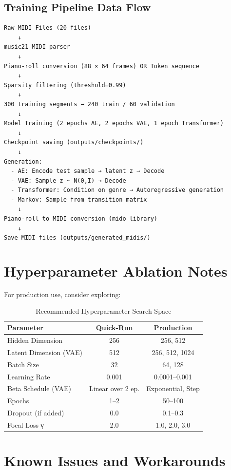 \subsection{Training Pipeline Data Flow}
\begin{verbatim}
Raw MIDI Files (20 files)
    ↓
music21 MIDI parser
    ↓
Piano-roll conversion (88 × 64 frames) OR Token sequence
    ↓
Sparsity filtering (threshold=0.99)
    ↓
300 training segments → 240 train / 60 validation
    ↓
Model Training (2 epochs AE, 2 epochs VAE, 1 epoch Transformer)
    ↓
Checkpoint saving (outputs/checkpoints/)
    ↓
Generation:
  - AE: Encode test sample → latent z → Decode
  - VAE: Sample z ~ N(0,I) → Decode
  - Transformer: Condition on genre → Autoregressive generation
  - Markov: Sample from transition matrix
    ↓
Piano-roll to MIDI conversion (mido library)
    ↓
Save MIDI files (outputs/generated_midis/)
\end{verbatim}

\section{Hyperparameter Ablation Notes}

For production use, consider exploring:

\begin{table}[h]
\centering
\caption{Recommended Hyperparameter Search Space}
\label{tab:ablation}
\begin{tabular}{lcc}
\toprule
\textbf{Parameter} & \textbf{Quick-Run} & \textbf{Production} \\
\midrule
Hidden Dimension & 256 & 256, 512 \\
Latent Dimension (VAE) & 512 & 256, 512, 1024 \\
Batch Size & 32 & 64, 128 \\
Learning Rate & 0.001 & 0.0001--0.001 \\
Beta Schedule (VAE) & Linear over 2 ep. & Exponential, Step \\
Epochs & 1--2 & 50--100 \\
Dropout (if added) & 0.0 & 0.1--0.3 \\
Focal Loss γ & 2.0 & 1.0, 2.0, 3.0 \\
\bottomrule
\end{tabular}
\end{table}

\section{Known Issues and Workarounds}

